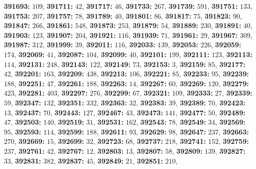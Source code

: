 \textsf{\bfseries 391693:} $109$, \textsf{\bfseries 391711:} $42$, \textsf{\bfseries 391717:} $46$, \textsf{\bfseries 391733:} $267$, \textsf{\bfseries 391739:} $591$, \textsf{\bfseries 391751:} $133$, \textsf{\bfseries 391753:} $207$, \textsf{\bfseries 391757:} $78$, \textsf{\bfseries 391789:} $40$, \textsf{\bfseries 391801:} $86$, \textsf{\bfseries 391817:} $75$, \textsf{\bfseries 391823:} $90$, \textsf{\bfseries 391847:} $266$, \textsf{\bfseries 391861:} $548$, \textsf{\bfseries 391873:} $253$, \textsf{\bfseries 391879:} $54$, \textsf{\bfseries 391889:} $230$, \textsf{\bfseries 391891:} $40$, \textsf{\bfseries 391903:} $123$, \textsf{\bfseries 391907:} $204$, \textsf{\bfseries 391921:} $116$, \textsf{\bfseries 391939:} $71$, \textsf{\bfseries 391961:} $29$, \textsf{\bfseries 391967:} $309$, \textsf{\bfseries 391987:} $312$, \textsf{\bfseries 391999:} $39$, \textsf{\bfseries 392011:} $116$, \textsf{\bfseries 392033:} $139$, \textsf{\bfseries 392053:} $226$, \textsf{\bfseries 392059:} $174$, \textsf{\bfseries 392069:} $41$, \textsf{\bfseries 392087:} $104$, \textsf{\bfseries 392099:} $40$, \textsf{\bfseries 392101:} $199$, \textsf{\bfseries 392111:} $123$, \textsf{\bfseries 392113:} $114$, \textsf{\bfseries 392131:} $248$, \textsf{\bfseries 392143:} $122$, \textsf{\bfseries 392149:} $73$, \textsf{\bfseries 392153:} $3$, \textsf{\bfseries 392159:} $85$, \textsf{\bfseries 392177:} $42$, \textsf{\bfseries 392201:} $163$, \textsf{\bfseries 392209:} $438$, \textsf{\bfseries 392213:} $106$, \textsf{\bfseries 392221:} $85$, \textsf{\bfseries 392233:} $95$, \textsf{\bfseries 392239:} $188$, \textsf{\bfseries 392251:} $47$, \textsf{\bfseries 392261:} $188$, \textsf{\bfseries 392263:} $14$, \textsf{\bfseries 392267:} $60$, \textsf{\bfseries 392269:} $120$, \textsf{\bfseries 392279:} $423$, \textsf{\bfseries 392281:} $403$, \textsf{\bfseries 392297:} $276$, \textsf{\bfseries 392299:} $67$, \textsf{\bfseries 392321:} $109$, \textsf{\bfseries 392333:} $27$, \textsf{\bfseries 392339:} $59$, \textsf{\bfseries 392347:} $132$, \textsf{\bfseries 392351:} $332$, \textsf{\bfseries 392363:} $32$, \textsf{\bfseries 392383:} $39$, \textsf{\bfseries 392389:} $70$, \textsf{\bfseries 392423:} $13$, \textsf{\bfseries 392437:} $70$, \textsf{\bfseries 392443:} $127$, \textsf{\bfseries 392467:} $43$, \textsf{\bfseries 392473:} $141$, \textsf{\bfseries 392477:} $50$, \textsf{\bfseries 392489:} $47$, \textsf{\bfseries 392503:} $140$, \textsf{\bfseries 392519:} $31$, \textsf{\bfseries 392531:} $162$, \textsf{\bfseries 392543:} $78$, \textsf{\bfseries 392549:} $34$, \textsf{\bfseries 392569:} $95$, \textsf{\bfseries 392593:} $114$, \textsf{\bfseries 392599:} $188$, \textsf{\bfseries 392611:} $93$, \textsf{\bfseries 392629:} $98$, \textsf{\bfseries 392647:} $237$, \textsf{\bfseries 392663:} $270$, \textsf{\bfseries 392669:} $15$, \textsf{\bfseries 392699:} $32$, \textsf{\bfseries 392723:} $68$, \textsf{\bfseries 392737:} $218$, \textsf{\bfseries 392741:} $152$, \textsf{\bfseries 392759:} $237$, \textsf{\bfseries 392761:} $42$, \textsf{\bfseries 392767:} $12$, \textsf{\bfseries 392803:} $13$, \textsf{\bfseries 392807:} $58$, \textsf{\bfseries 392809:} $139$, \textsf{\bfseries 392827:} $33$, \textsf{\bfseries 392831:} $382$, \textsf{\bfseries 392837:} $45$, \textsf{\bfseries 392849:} $21$, \textsf{\bfseries 392851:} $210$, 
